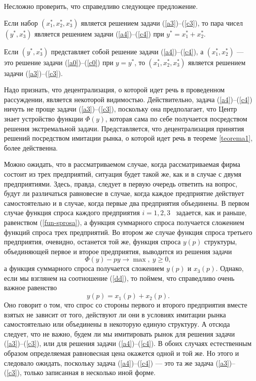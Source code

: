 Несложно проверить, что справедливо следующее предложение.
\begin{prop}
\label{qq1} Если набор $(x_{1}^{*},x_{2}^{*},x_{3}^{*})$ является
решением задачи (\ref{a3})--(\ref{c3}), то пара чисел
$(y^{*},x_{3}^{*})$ является решением задачи (\ref{a4})--(\ref{c4})
при $y^{*}=x_{1}^{*}+x_{2}^{*}$.

Если $(y^{*},x_{3}^{*})$ представляет собой решение задачи
(\ref{a4})--(\ref{c4}), а $(x_{1}^{*},x_{2}^{*})$ --- это решение
задачи (\ref{a0})--(\ref{c0}) при $y=y^{*}$, то
$(x_{1}^{*},x_{2}^{*},x_{3}^{*})$ является решением задачи
(\ref{a3})--(\ref{c3}).
\end{prop}

 Надо признать, что децентрализация, о которой идет речь в
 проведенном рассуждении, является некоторой видимостью.
 Действительно, задача (\ref{a4})--(\ref{c4}) ничуть не проще задачи
 (\ref{a3})--(\ref{c3}), поскольку она предполагает, что Центр знает
 устройство функции $\Phi(y)$, которая сама по себе получается
 посредством решения экстремальной задачи. Представляется, что
 децентрализация принятия решений посредством имитации рынка, о
 которой идет речь в теореме \ref{teorema1}, более действенна.

 Можно ожидать, что в рассматриваемом случае, когда рассматриваемая
 фирма состоит из трех предприятий, ситуация будет
 такой же, как и в случае с двумя предприятиями. Здесь, правда,
 следует в первую очередь ответить на вопрос, будут ли различаться
 равновесие в случае, когда каждое предприятие действует
 самостоятельно и в случае, когда первые два предприятия объединены.
 В первом случае функция спроса каждого предприятия $i=1,2,3$ \
 задается, как и раньше, равенством  (\ref{fun-sprosa}), а функция
 суммарного спроса получается сложением функций спроса трех
 предприятий.
 Во втором же
 случае функция спроса третьего предприятия, очевидно, останется той
 же, функция спроса $y(p)$ структуры, объединяющей первое и второе
 предприятия, выводится из решения задачи
\begin{equation}
\label{y(p)}
 \Phi(y)-py\rightarrow\max,\ y\geqslant0,
\end{equation}
 а функция суммарного спроса получается сложением $y(p)$ и $x_{3}(p)$.
 Однако, если мы взглянем на соотношение (\ref{dd}), то поймем, что
 справедливо очень важное равенство
\begin{equation}
\label{y(p)=summa}
 y(p)=x_{1}(p)+x_{2}(p).
\end{equation}
 Оно говорит о том, что спрос со стороны первого и второго
 предприятия вместе взятых не зависит от того, действуют ли они в условиях
 имитации рынка самостоятельно или объединены в некоторую единую
 структуру. А отсюда следует, что не важно, будем ли мы имитировать
 рынок для решения задачи (\ref{a3})--(\ref{c3}), или для решения
 задачи (\ref{a4})--(\ref{c4}). В обоих случаях естественным образом
 определяемая равновесная цена
 окажется одной и той же. Но этого и следовало ожидать, поскольку
 задача (\ref{a4})--(\ref{c4}) --- это та же задача
 (\ref{a3})--(\ref{c3}), только записанная в несколько иной форме.

